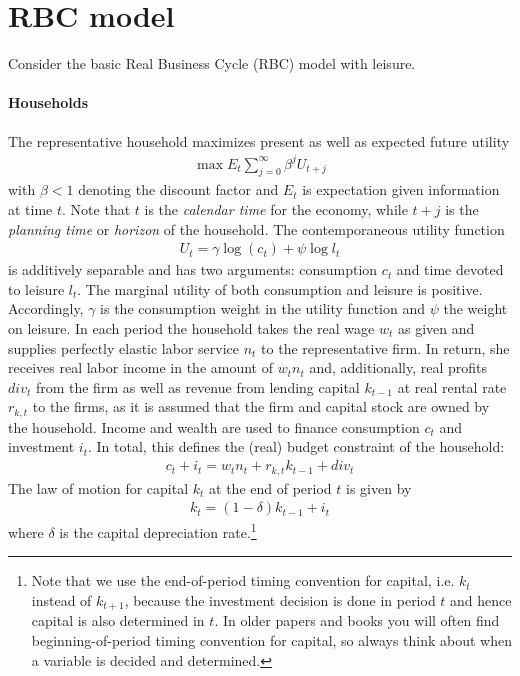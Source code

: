 \section[RBC model]{RBC model\label{ex:RBCModel}}
Consider the basic Real Business Cycle (RBC) model with leisure.
\paragraph{Households}
The representative household maximizes present as well as expected future utility
\begin{align*}
	\max E_t \sum_{j=0}^{\infty} \beta^{j} U_{t+j}
\end{align*}
with $\beta <1$ denoting the discount factor and $E_t$ is expectation given information at time $t$.
Note that $t$ is the \emph{calendar time} for the economy, while $t+j$ is the \emph{planning time} or \emph{horizon} of the household.
The contemporaneous utility function 
\begin{align*}
	U_t = \gamma \log(c_t) + \psi \log{l_t}
\end{align*}
is additively separable and has two arguments: consumption $c_t$ and time devoted to leisure $l_{t}$.
The marginal utility of both consumption and leisure is positive.
Accordingly, $\gamma$ is the consumption weight in the utility function and $\psi$ the weight on leisure.
In each period the household takes the real wage $w_t$ as given and supplies perfectly elastic labor service $n_t$ to the representative firm.
In return, she receives real labor income in the amount of $w_t n_{t}$ and, additionally,
  real profits ${div}_t$ from the firm as well as revenue from lending capital $k_{t-1}$ at real rental rate $r_{k,t}$ to the firms,
  as it is assumed that the firm and capital stock are owned by the household.
Income and wealth are used to finance consumption $c_t$ and investment $i_t$.
In total, this defines the (real) budget constraint of the household:
\begin{align*}
c_t + i_t = w_t n_{t} + r_{k,t} k_{t-1} + {div}_t
\end{align*}
The law of motion for capital $k_t$ at the end of period $t$ is given by
\begin{align*}
k_{t} = (1-\delta) k_{t-1} + i_t
\end{align*}
where $\delta$ is the capital depreciation rate.\footnote{
Note that we use the end-of-period timing convention for capital, i.e. $k_t$ instead of $k_{t+1}$,
  because the investment decision is done in period $t$ and hence capital is also determined in $t$.
In older papers and books you will often find beginning-of-period timing convention for capital,
  so always think about when a variable is decided and determined.}
  
